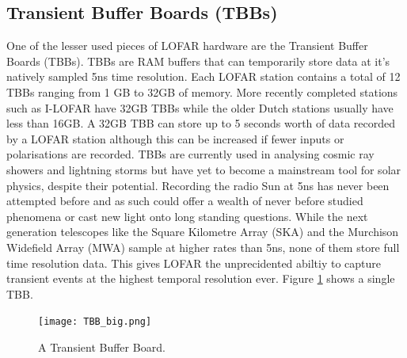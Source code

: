 \subsection{Transient Buffer Boards (TBBs)}
\label{sec:tbb}
One of the lesser used pieces of LOFAR hardware are the Transient Buffer Boards (TBBs). TBBs are RAM buffers that can temporarily store data at it's natively sampled 5ns time resolution. Each LOFAR station contains a total of 12 TBBs ranging from 1 GB to 32GB of memory. More recently completed stations such as I-LOFAR have 32GB TBBs while the older Dutch stations usually have less than 16GB.
A 32GB TBB can store up to 5 seconds worth of data recorded by a LOFAR station although this can be increased if fewer inputs or polarisations are recorded. TBBs are currently used in analysing cosmic ray showers \citep{Mulrey2020} and lightning storms \citep{Hare2018} but have yet to become a mainstream tool for solar physics, despite their potential. 
Recording the radio Sun at 5ns has never been attempted before and as such could offer a wealth of never before studied phenomena or cast new light onto long standing questions.
While the next generation telescopes like the Square Kilometre Array (SKA) and the Murchison Widefield Array (MWA) sample at higher rates than 5ns, none of them store full time resolution data. This gives LOFAR the unprecidented abiltiy to capture transient events at the highest temporal resolution ever. Figure \ref{fig:TBB} shows a single TBB.

\begin{figure}[ht]
\centering
\texttt{[image: TBB\_big.png]}
\caption[A Transient Buffer Board.]{A Transient Buffer Board.}
\label{fig:TBB}
\end{figure}

